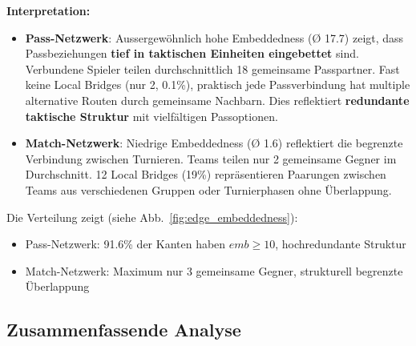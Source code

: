 \textbf{Interpretation:}
\begin{itemize}
  \item \textbf{Pass-Netzwerk}: Aussergewöhnlich hohe Embeddedness (Ø 17.7) zeigt, dass Passbeziehungen \textbf{tief in taktischen Einheiten eingebettet} sind. Verbundene Spieler teilen durchschnittlich 18 gemeinsame Passpartner. Fast keine Local Bridges (nur 2, 0.1\%), praktisch jede Passverbindung hat multiple alternative Routen durch gemeinsame Nachbarn. Dies reflektiert \textbf{redundante taktische Struktur} mit vielfältigen Passoptionen.
  \item \textbf{Match-Netzwerk}: Niedrige Embeddedness (Ø 1.6) reflektiert die begrenzte Verbindung zwischen Turnieren.
  Teams teilen nur 2 gemeinsame Gegner im Durchschnitt. 12 Local Bridges (19\%) repräsentieren Paarungen zwischen Teams aus verschiedenen Gruppen oder Turnierphasen ohne Überlappung.
\end{itemize}

Die Verteilung zeigt (siehe Abb.~\ref{fig:edge_embeddedness}):
\begin{itemize}
  \item Pass-Netzwerk: 91.6\% der Kanten haben $emb \geq 10$, hochredundante Struktur
  \item Match-Netzwerk: Maximum nur 3 gemeinsame Gegner, strukturell begrenzte Überlappung
\end{itemize}

\subsection{Zusammenfassende Analyse}

\begin{table}[h]
\centering
\caption{Umfassende Netzwerk-Metriken (Zusammenfassung)}
\label{tab:comprehensive_metrics}
\end{table}

